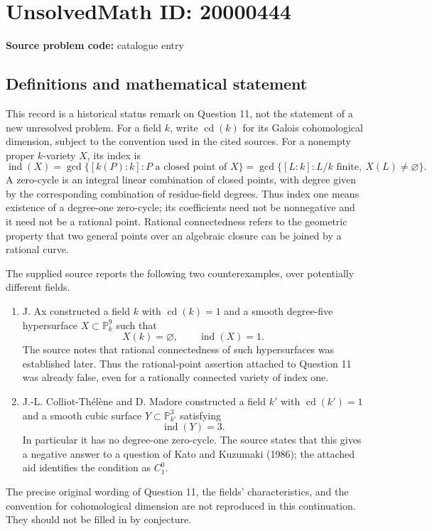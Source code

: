 \documentclass[11pt]{article}
\newcommand{\PP}{\mathbb{P}}
\begin{document}
\section*{UnsolvedMath ID: 20000444}
\textbf{Source problem code:} catalogue entry
\subsection{Definitions and mathematical statement}
This record is a historical status remark on Question 11, not the statement of a new unresolved problem. For a field \(k\), write \(\operatorname{cd}(k)\) for its Galois cohomological dimension, subject to the convention used in the cited sources. For a nonempty proper \(k\)-variety \(X\), its index is
\[
\operatorname{ind}(X)=\gcd\{[k(P):k]:P\text{ a closed point of }X\}
=\gcd\{[L:k]:L/k\text{ finite},\ X(L)\ne\varnothing\}.
\]
A zero-cycle is an integral linear combination of closed points, with degree given by the corresponding combination of residue-field degrees. Thus index one means existence of a degree-one zero-cycle; its coefficients need not be nonnegative and it need not be a rational point. Rational connectedness refers to the geometric property that two general points over an algebraic closure can be joined by a rational curve.

The supplied source reports the following two counterexamples, over potentially different fields.
\begin{enumerate}
\item J. Ax constructed a field \(k\) with \(\operatorname{cd}(k)=1\) and a smooth degree-five hypersurface \(X\subset\PP^9_k\) such that
\[
X(k)=\varnothing,\qquad \operatorname{ind}(X)=1.
\]
The source notes that rational connectedness of such hypersurfaces was established later. Thus the rational-point assertion attached to Question 11 was already false, even for a rationally connected variety of index one.
\item J.-L. Colliot-Th\'el\`ene and D. Madore constructed a field \(k'\) with \(\operatorname{cd}(k')=1\) and a smooth cubic surface \(Y\subset\PP^3_{k'}\) satisfying
\[
\operatorname{ind}(Y)=3.
\]
In particular it has no degree-one zero-cycle. The source states that this gives a negative answer to a question of Kato and Kuzumaki (1986); the attached aid identifies the condition as \(C_1^0\).
\end{enumerate}
The precise original wording of Question 11, the fields' characteristics, and the convention for cohomological dimension are not reproduced in this continuation. They should not be filled in by conjecture.
\end{document}
